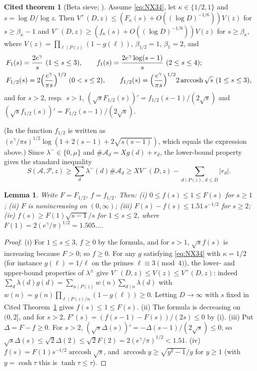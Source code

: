 \documentclass[11pt,reqno]{amsart}
\newtheorem{lemma}[theorem]{Lemma}
\theoremstyle{definition}
\newtheorem{citedthm}[theorem]{Cited theorem}
\newcommand{\cA}{\mathcal A}
\begin{document}
\begin{citedthm}[Beta sieve; {\cite[Lemma~3.6, Remark~3.7, \S5]{NX}}]\label{cit:beta}
Assume \eqref{eq:NX34}, let $\kappa\in\{1/2,1\}$ and $s=\log D/\log z$.  Then
$V^+(D,z)\le(F_\kappa(s)+O((\log D)^{-1/6}))V(z)$ for $s\ge\beta_\kappa-1$ and
$V^-(D,z)\ge(f_\kappa(s)+O((\log D)^{-1/6}))V(z)$ for $s\ge\beta_\kappa$,
where $V(z)=\prod_{\ell\mid P(z)}(1-g(\ell))$, $\beta_{1/2}=1$,
$\beta_1=2$, and
\begin{align*}
&F_1(s)=\frac{2e^\gamma}s\ (1\le s\le3),\qquad f_1(s)=\frac{2e^\gamma\log(s-1)}s\ (2\le s\le4);\\
&F_{1/2}(s)=2\Bigl(\frac{e^\gamma}{\pi s}\Bigr)^{1/2}\ (0<s\le2),\qquad
f_{1/2}(s)=\Bigl(\frac{e^\gamma}{\pi s}\Bigr)^{1/2}2\operatorname{arccosh}\sqrt s\ (1\le s\le3),
\end{align*}
and for $s>2$, resp.\ $s>1$,
$(\sqrt sF_{1/2}(s))'=f_{1/2}(s-1)/(2\sqrt s)$ and
$(\sqrt sf_{1/2}(s))'=F_{1/2}(s-1)/(2\sqrt s)$.
\end{citedthm}

(In \cite[\S5]{NX} the function $f_{1/2}$ is written as
$(e^\gamma/\pi s)^{1/2}\log(1+2(s-1)+2\sqrt{s(s-1)})$, which equals the
expression above.)  Since $\lambda^-\in\{0,\mu\}$ and $\#\cA_d=Xg(d)+r_d$,
the lower-bound property gives the standard inequality
\begin{equation}\label{eq:lowersieve}
S(\cA,\mathcal P,z)\ge\sum_{d}\lambda^-(d)\#\cA_d\ge XV^-(D,z)-\sum_{d\mid P(z),\,d\le D}|r_d|.
\end{equation}

\begin{lemma}\label{lem:semilinear}
Write $F=F_{1/2}$, $f=f_{1/2}$.  Then:
(i) $0\le f(s)\le1\le F(s)$ for $s\ge1$;
(ii) $F$ is nonincreasing on $(0,\infty)$;
(iii) $F(s)-f(s)\le1.51\,s^{-1/2}$ for $s\ge2$;
(iv) $f(s)\ge F(1)\sqrt{s-1}/s$ for $1\le s\le2$, where
$F(1)=2(e^\gamma/\pi)^{1/2}=1.505\ldots$.
\end{lemma}

\begin{proof}
(i) For $1\le s\le 3$, $f\ge0$ by the formula, and for $s>1$,
$\sqrt sf(s)$ is increasing because $F>0$; so $f\ge0$.  For any $g$
satisfying \eqref{eq:NX34} with $\kappa=1/2$ (for instance $g(\ell)=1/\ell$
on the primes $\ell\equiv3\pmod4$), the lower- and upper-bound properties
of $\lambda^\pm$ give $V^-(D,z)\le V(z)\le V^+(D,z)$: indeed
$\sum_d\lambda(d)g(d)=\sum_{n\mid P(z)}w(n)\sum_{d\mid n}\lambda(d)$ with
$w(n)=g(n)\prod_{\ell\mid P(z)/n}(1-g(\ell))\ge0$.  Letting $D\to\infty$
with $s$ fixed in Cited Theorem~\ref{cit:beta} gives $f(s)\le1\le F(s)$.
(ii) The formula is decreasing on $(0,2]$, and for $s>2$,
$F'(s)=(f(s-1)-F(s))/(2s)\le0$ by (i).
(iii) Put $\Delta=F-f\ge0$.  For $s>2$,
$(\sqrt s\Delta(s))'=-\Delta(s-1)/(2\sqrt s)\le0$, so
$\sqrt s\Delta(s)\le\sqrt2\Delta(2)\le\sqrt2F(2)=2(e^\gamma/\pi)^{1/2}<1.51$.
(iv) $f(s)=F(1)s^{-1/2}\operatorname{arccosh}\sqrt s$, and
$\operatorname{arccosh}y\ge\sqrt{y^2-1}/y$ for $y\ge1$ (with $y=\cosh\tau$
this is $\tanh\tau\le\tau$).
\end{proof}
\end{document}
